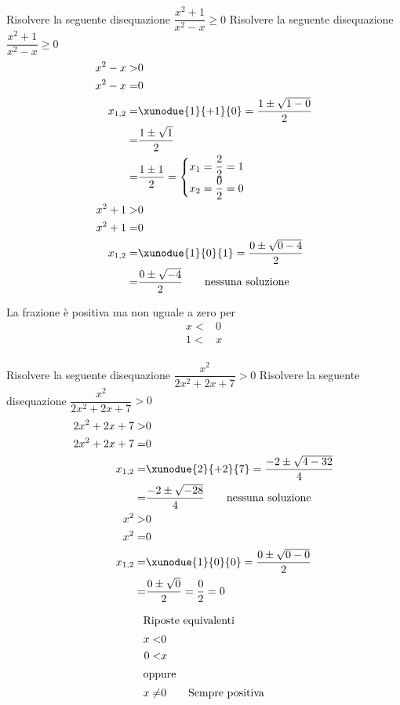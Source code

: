 \begin{exercise}
		Risolvere la seguente disequazione $\dfrac{x^2+1}{x^2-x}\geq0$
	\tcblower
	Risolvere la seguente disequazione $\dfrac{x^2+1}{x^2-x}\geq0$	
\begin{align*}
x^2-x>&0\\
x^2-x=&0\\
x_{1,2}=&\xunodue{1}{+1}{0}=\dfrac{1\pm\sqrt{1-0}}{2}\\
=&\dfrac{1\pm\sqrt{1}}{2}\\
=&\dfrac{1\pm 1}{2}=\begin{cases}
	x_1=\dfrac{2}{2}=1\\
	x_2=\dfrac{0}{2}=0
\end{cases}\\
x^2+1>&0\\
x^2+1=&0\\
x_{1,2}=&\xunodue{1}{0}{1}=\dfrac{0\pm\sqrt{0-4}}{2}\\
=&\dfrac{0\pm\sqrt{-4}}{2}
\qquad\text{nessuna soluzione}\\
\end{align*}
\begin{center}

\end{center}
La frazione è positiva ma non uguale a zero per
\begin{align*}
x<&0\\ 1<&x\\
\end{align*}
\end{exercise}
\begin{exercise}
		Risolvere la seguente disequazione $\dfrac{x^2}{2x^2+2x+7}> 0$
	\tcblower
		Risolvere la seguente disequazione $\dfrac{x^2}{2x^2+2x+7}> 0$
	\begin{align*}
	2x^2+2x+7>&0\\
	2x^2+2x+7=&0\\
	x_{1,2}=&\xunodue{2}{+2}{7}=\dfrac{-2\pm\sqrt{4-32}}{4}\\
	=&\dfrac{-2\pm\sqrt{-28}}{4}
	\qquad\text{nessuna soluzione}\\
	x^2>&0\\
	x^2=&0\\
	x_{1,2}=&\xunodue{1}{0}{0}=\dfrac{0\pm\sqrt{0-0}}{2}\\
	=&\dfrac{0\pm\sqrt{0}}{2}=\dfrac{0}{2}=0\\
	\end{align*}
	\begin{center}
		
	\end{center}	
		\begin{align*}
		\intertext{Riposte equivalenti}
		x<&0\\ 0<&x\\
		\intertext{oppure}
		x\neq&0\qquad\text{Sempre positiva}
		\end{align*}
\end{exercise}
